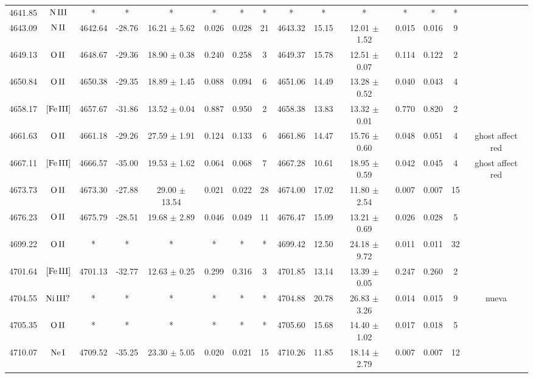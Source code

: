 \documentclass{article}
\begin{document}
\begin{table*}
\begin{adjustbox}{width=\textwidth}
\begin{tabular}{ccccccccccccccc}
4641.85 & $\mbox{N}\thinspace \mbox{III}$ & * & * & * & * & * & * & * & * & * & * & * & * &  \\
4643.09 & $\mbox{N}\thinspace \mbox{II}$ & 4642.64 & -28.76 & 16.21 $\pm$ 5.62 & 0.026 & 0.028 & 21 & 4643.32 & 15.15 & 12.01 $\pm$ 1.52 & 0.015 & 0.016 & 9 &  \\
4649.13 & $\mbox{O}\thinspace \mbox{II}$ & 4648.67 & -29.36 & 18.90 $\pm$ 0.38 & 0.240 & 0.258 & 3 & 4649.37 & 15.78 & 12.51 $\pm$ 0.07 & 0.114 & 0.122 & 2 &  \\
4650.84 & $\mbox{O}\thinspace \mbox{II}$ & 4650.38 & -29.35 & 18.89 $\pm$ 1.45 & 0.088 & 0.094 & 6 & 4651.06 & 14.49 & 13.28 $\pm$ 0.52 & 0.040 & 0.043 & 4 &  \\
4658.17 & $\mbox{[Fe}\thinspace \mbox{III]}$ & 4657.67 & -31.86 & 13.52 $\pm$ 0.04 & 0.887 & 0.950 & 2 & 4658.38 & 13.83 & 13.32 $\pm$ 0.01 & 0.770 & 0.820 & 2 &  \\
4661.63 & $\mbox{O}\thinspace \mbox{II}$ & 4661.18 & -29.26 & 27.59 $\pm$ 1.91 & 0.124 & 0.133 & 6 & 4661.86 & 14.47 & 15.76 $\pm$ 0.60 & 0.048 & 0.051 & 4 &  ghost affect red \\
4667.11 & $\mbox{[Fe}\thinspace \mbox{III]}$ & 4666.57 & -35.00 & 19.53 $\pm$ 1.62 & 0.064 & 0.068 & 7 & 4667.28 & 10.61 & 18.95 $\pm$ 0.59 & 0.042 & 0.045 & 4 &  ghost affect red \\
4673.73 & $\mbox{O}\thinspace \mbox{II}$ & 4673.30 & -27.88 & 29.00 $\pm$ 13.54 & 0.021 & 0.022 & 28 & 4674.00 & 17.02 & 11.80 $\pm$ 2.54 & 0.007 & 0.007 & 15 &  \\
4676.23 & $\mbox{O}\thinspace \mbox{II}$ & 4675.79 & -28.51 & 19.68 $\pm$ 2.89 & 0.046 & 0.049 & 11 & 4676.47 & 15.09 & 13.21 $\pm$ 0.69 & 0.026 & 0.028 & 5 &  \\
4699.22 & $\mbox{O}\thinspace \mbox{II}$ & * & * & * & * & * & * & 4699.42 & 12.50 & 24.18 $\pm$ 9.72 & 0.011 & 0.011 & 32 &  \\
4701.64 & $\mbox{[Fe}\thinspace \mbox{III]}$ & 4701.13 & -32.77 & 12.63 $\pm$ 0.25 & 0.299 & 0.316 & 3 & 4701.85 & 13.14 & 13.39 $\pm$ 0.05 & 0.247 & 0.260 & 2 &  \\
4704.55 & $\mbox{Ni}\thinspace \mbox{III?}$ & * & * & * & * & * & * & 4704.88 & 20.78 & 26.83 $\pm$ 3.26 & 0.014 & 0.015 & 9 &  nueva \\
4705.35 & $\mbox{O}\thinspace \mbox{II}$ & * & * & * & * & * & * & 4705.60 & 15.68 & 14.40 $\pm$ 1.02 & 0.017 & 0.018 & 5 &  \\
4710.07 & $\mbox{Ne}\thinspace \mbox{I}$ & 4709.52 & -35.25 & 23.30 $\pm$ 5.05 & 0.020 & 0.021 & 15 & 4710.26 & 11.85 & 18.14 $\pm$ 2.79 & 0.007 & 0.007 & 12 &  \\

\end{tabular}
\end{adjustbox}
\end{table*}
\end{document}
